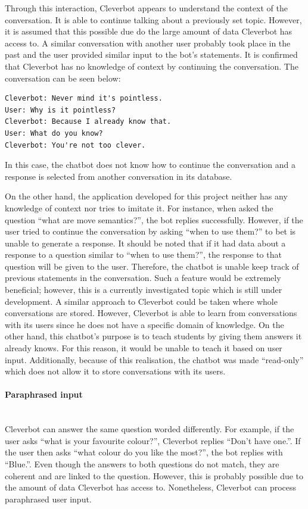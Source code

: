 \documentclass[12pt,a4paper]{article}
\newcommand{\myparagraph}[1]{\paragraph{#1}\mbox{}\\}
\begin{document}
Through this interaction, Cleverbot appears to understand the context of the conversation. It is able to continue talking about a previously set topic. However, it is assumed that this possible due do the large amount of data Cleverbot has access to. A similar conversation with another user probably took place in the past and the user provided similar input to the bot’s statements. It is confirmed that Cleverbot has no knowledge of context by continuing the conversation. The conversation can be seen below:

\begin{verbatim}
Cleverbot: Never mind it's pointless.
User: Why is it pointless?
Cleverbot: Because I already know that.
User: What do you know?
Cleverbot: You're not too clever.
\end{verbatim}

In this case, the chatbot does not know how to continue the conversation and a response is selected from another conversation in its database.

On the other hand, the application developed for this project neither has any knowledge of context nor tries to imitate it. For instance, when asked the question “what are move semantics?”, the bot replies successfully. However, if the user tried to continue the conversation by asking “when to use them?” to bet is unable to generate a response. It should be noted that if it had data about a response to a question similar to “when to use them?”, the response to that question will be given to the user. Therefore, the chatbot is unable keep track of previous statements in the conversation. Such a feature would be extremely beneficial; however, this is a currently investigated topic which is still under development. A similar approach to Cleverbot could be taken where whole conversations are stored. However, Cleverbot is able to learn from conversations with its users since he does not have a specific domain of knowledge. On the other hand, this chatbot’s purpose is to teach students by giving them answers it already knows. For this reason, it would be unable to teach it based on user input. Additionally, because of this realisation, the chatbot was made “read-only” which does not allow it to store conversations with its users.

\myparagraph{Paraphrased input}
Cleverbot can answer the same question worded differently. For example, if the user asks “what is your favourite colour?”, Cleverbot replies “Don’t have one.”. If the user then asks “what colour do you like the most?”, the bot replies with “Blue.”. Even though the answers to both questions do not match, they are coherent and are linked to the question. However, this is probably possible due to the amount of data Cleverbot has access to. Nonetheless, Cleverbot can process paraphrased user input. 
\end{document}
